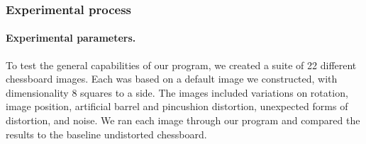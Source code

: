 \subsubsection{Experimental process}

\paragraph{Experimental parameters.}
To test the general capabilities of our program, we created a suite of 22 different chessboard images. Each was based on a default image we constructed, with dimensionality 8 squares to a side. The images included variations on rotation, image position, artificial barrel and pincushion distortion, unexpected forms of distortion, and noise. We ran each image through our program and compared the results to the baseline undistorted chessboard.

